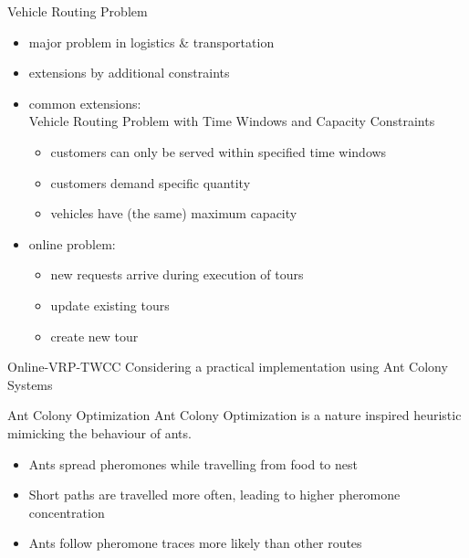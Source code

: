 \begin{frame}{Vehicle Routing Problem}

  \begin{itemize}
    \item major problem in logistics \& transportation
    \item extensions by additional constraints
    \item<2-> common extensions: \\Vehicle Routing Problem \alert{with Time Windows and Capacity Constraints}
      \begin{itemize}
        \item customers can only be served within specified time windows
	\item customers demand specific quantity
	\item vehicles have (the same) maximum capacity
      \end{itemize}
    \item<3> online problem: 
      \begin{itemize}
        \item new requests arrive during execution of tours
	\item update existing tours
	\item create new tour
      \end{itemize}
  \end{itemize}
   
\end{frame}

\begin{frame}{Online-VRP-TWCC}
  Considering a practical implementation using Ant Colony Systems

  \begin{block}{Ant Colony Optimization}
    \alert{Ant Colony Optimization} is a nature inspired heuristic mimicking the behaviour of ants.
  \end{block}
  \begin{itemize}
    \item Ants spread pheromones while travelling from food to nest
    \item Short paths are travelled more often, leading to higher pheromone concentration
    \item Ants follow pheromone traces more likely than other routes
  \end{itemize}

\end{frame}

